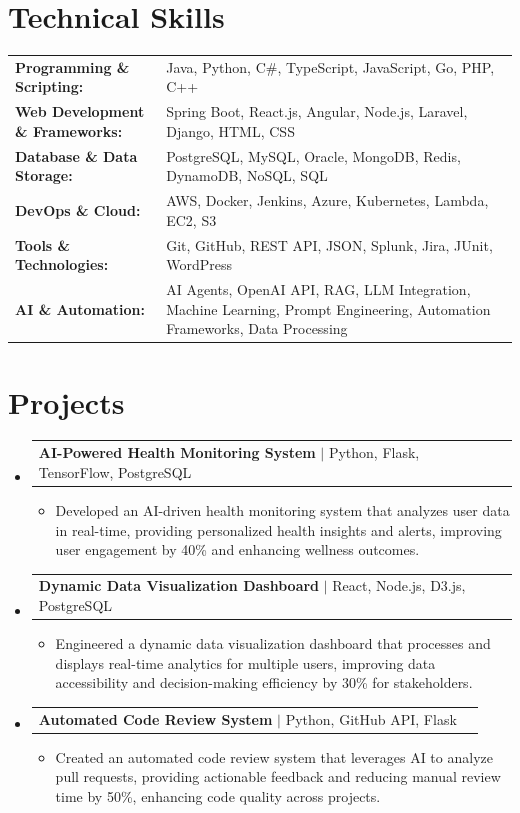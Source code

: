\documentclass[letterpaper,10pt]{article}
\makeatletter
\newcommand{\resumeItem}[1]{
  \item{\fontsize{8pt}{9pt}\selectfont
    #1 \vspace{-3pt}
  }
}
\newcommand{\resumeProjectHeading}[2]{
    \item
    \begin{tabular*}{1.001\textwidth}{l@{\extracolsep{\fill}}r}
      \fontsize{8.5pt}{10pt}#1 & \textbf{\fontsize{8.5pt}{10pt} #2}\\
    \end{tabular*}\vspace{-7pt}
}
\newcommand{\resumeSubHeadingListStart}{\begin{itemize}[leftmargin=0pt, label={}]}
\newcommand{\resumeSubHeadingListEnd}{\end{itemize}}
\newcommand{\resumeItemListStart}{\begin{itemize}[leftmargin=*]}
\newcommand{\resumeItemListEnd}{\end{itemize}\vspace{-5pt}}
\makeatother
\begin{document}
\section{Technical Skills}
        \vspace{-14pt}
        \begin{table}[h]
            \fontsize{8pt}{9pt}\selectfont
            \begin{tabular}{p{0.3\linewidth} p{0.7\linewidth}}
                \textbf{Programming \& Scripting:} & Java, Python, C\#, TypeScript, JavaScript, Go, PHP, C++ \\
                \textbf{Web Development \& Frameworks:} & Spring Boot, React.js, Angular, Node.js, Laravel, Django, HTML, CSS \\
                \textbf{Database \& Data Storage:} & PostgreSQL, MySQL, Oracle, MongoDB, Redis, DynamoDB, NoSQL, SQL \\
                \textbf{DevOps \& Cloud:} & AWS, Docker, Jenkins, Azure, Kubernetes, Lambda, EC2, S3 \\
                \textbf{Tools \& Technologies:} & Git, GitHub, REST API, JSON, Splunk, Jira, JUnit, WordPress \\
                \textbf{AI \& Automation:} & AI Agents, OpenAI API, RAG, LLM Integration, Machine Learning, Prompt Engineering, Automation Frameworks, Data Processing \\
            \end{tabular}
        \end{table}
 \vspace{-18pt}

\section{Projects}
    \vspace{-5pt}
    \resumeSubHeadingListStart
          \resumeProjectHeading
            {\textbf{AI-Powered Health Monitoring System} $|$ Python, Flask, TensorFlow, PostgreSQL}{}
            \resumeItemListStart
                \resumeItem{Developed an AI-driven health monitoring system that analyzes user data in real-time, providing personalized health insights and alerts, improving user engagement by 40\% and enhancing wellness outcomes.}
            \resumeItemListEnd
        \vspace{-12pt}
    
        \resumeProjectHeading
            {\textbf{Dynamic Data Visualization Dashboard} $|$ React, Node.js, D3.js, PostgreSQL}{}
        \resumeItemListStart
                \resumeItem{Engineered a dynamic data visualization dashboard that processes and displays real-time analytics for multiple users, improving data accessibility and decision-making efficiency by 30\% for stakeholders.}
        \resumeItemListEnd
      \vspace{-12pt}
      \resumeProjectHeading
        {\textbf{Automated Code Review System} $|$ Python, GitHub API, Flask}{}
    \resumeItemListStart
            \resumeItem{Created an automated code review system that leverages AI to analyze pull requests, providing actionable feedback and reducing manual review time by 50\%, enhancing code quality across projects.}
    \resumeItemListEnd
    \resumeSubHeadingListEnd
\end{document}
